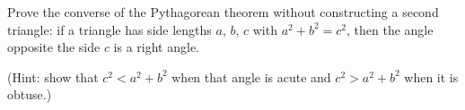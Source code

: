 Prove the converse of the Pythagorean theorem without constructing a second triangle: if a triangle has side lengths $a$, $b$, $c$ with $a^2+b^2=c^2$, then the angle opposite the side $c$ is a right angle.

(Hint: show that $c^2<a^2+b^2$ when that angle is acute and $c^2>a^2+b^2$ when it is obtuse.)
